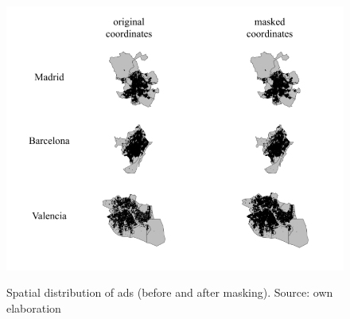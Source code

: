 \documentclass[times,final]{elsarticle}
\begin{document}
\begin{figure}[!ht]
  \caption{Spatial distribution of ads (before and after masking). Source: own elaboration}
  \centering
  \includegraphics[width=12cm]{figures/points-pre-post-all}
  \label{fig:points-pre-post-all}
\end{figure}



%

%
%
\end{document}
